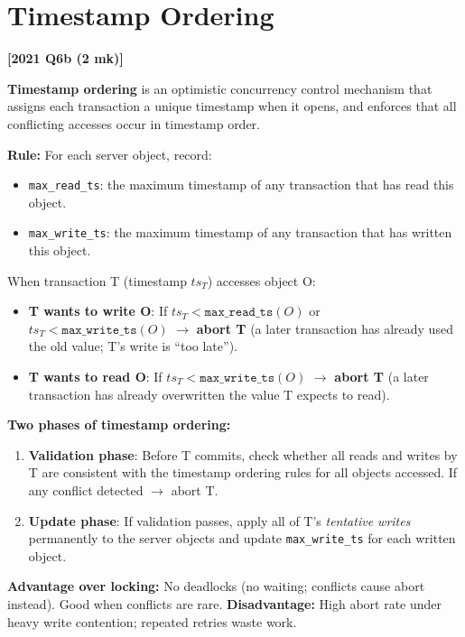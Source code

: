 \documentclass[11pt,a4paper]{article}
\newcommand{\qref}[1]{\textbf{\textcolor{examblue}{[#1]}}}
\newcommand{\mk}[1]{\textcolor{slidegray}{\small(#1 mk)}}
\newcommand{\key}[1]{\textbf{\textcolor{keyred}{#1}}}
\begin{document}
\section{Timestamp Ordering}
\qref{2021 Q6b \mk{2}}

\begin{answerbox}
\key{Timestamp ordering} is an optimistic concurrency control mechanism that assigns each transaction a unique timestamp when it opens, and enforces that all conflicting accesses occur in timestamp order.

\textbf{Rule:} For each server object, record:
\begin{itemize}
  \item \texttt{max\_read\_ts}: the maximum timestamp of any transaction that has read this object.
  \item \texttt{max\_write\_ts}: the maximum timestamp of any transaction that has written this object.
\end{itemize}

When transaction T (timestamp $ts_T$) accesses object O:
\begin{itemize}
  \item \textbf{T wants to write O}: If $ts_T < \mathtt{max\_read\_ts}(O)$ or $ts_T < \mathtt{max\_write\_ts}(O)$ $\to$ \textbf{abort T} (a later transaction has already used the old value; T's write is ``too late'').
  \item \textbf{T wants to read O}: If $ts_T < \mathtt{max\_write\_ts}(O)$ $\to$ \textbf{abort T} (a later transaction has already overwritten the value T expects to read).
\end{itemize}

\textbf{Two phases of timestamp ordering:}

\begin{enumerate}
  \item \key{Validation phase}: Before T commits, check whether all reads and writes by T are consistent with the timestamp ordering rules for all objects accessed. If any conflict detected $\to$ abort T.
  \item \key{Update phase}: If validation passes, apply all of T's \emph{tentative writes} permanently to the server objects and update \texttt{max\_write\_ts} for each written object.
\end{enumerate}

\textbf{Advantage over locking:} No deadlocks (no waiting; conflicts cause abort instead). Good when conflicts are rare. \textbf{Disadvantage:} High abort rate under heavy write contention; repeated retries waste work.
\end{answerbox}
\end{document}
